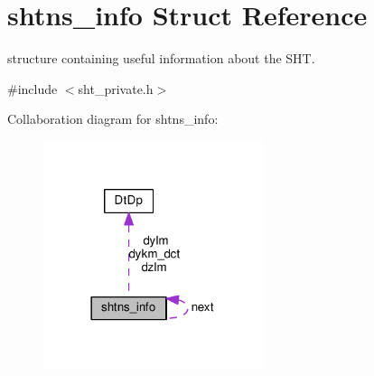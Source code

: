 \hypertarget{structshtns__info}{}\section{shtns\+\_\+info Struct Reference}
\label{structshtns__info}


structure containing useful information about the S\+H\+T.  




{\ttfamily \#include $<$sht\+\_\+private.\+h$>$}



Collaboration diagram for shtns\+\_\+info\+:
\nopagebreak
\begin{figure}[H]
\begin{center}
\leavevmode
\includegraphics[width=182pt]{structshtns__info__coll__graph}
\end{center}
\end{figure}
